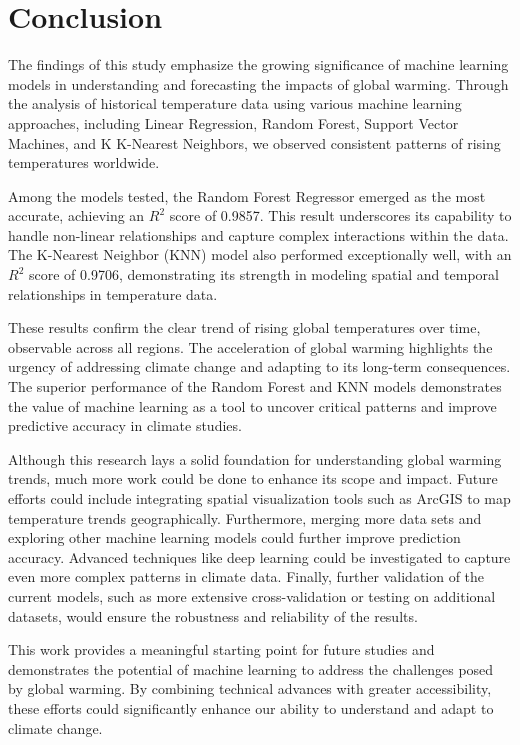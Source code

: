 \documentclass[conference]{IEEEtran}
\begin{document}
\section{Conclusion}
The findings of this study emphasize the growing significance of machine learning models in understanding and forecasting the impacts of global warming. Through the analysis of historical temperature data using various machine learning approaches, including Linear Regression, Random Forest, Support Vector Machines, and K K-Nearest Neighbors, we observed consistent patterns of rising temperatures worldwide.

Among the models tested, the Random Forest Regressor emerged as the most accurate, achieving an \(R^2\) score of 0.9857. This result underscores its capability to handle non-linear relationships and capture complex interactions within the data. The K-Nearest Neighbor (KNN) model also performed exceptionally well, with an \(R^2\) score of 0.9706, demonstrating its strength in modeling spatial and temporal relationships in temperature data.

These results confirm the clear trend of rising global temperatures over time, observable across all regions. The acceleration of global warming highlights the urgency of addressing climate change and adapting to its long-term consequences. The superior performance of the Random Forest and KNN models demonstrates the value of machine learning as a tool to uncover critical patterns and improve predictive accuracy in climate studies.

Although this research lays a solid foundation for understanding global warming trends, much more work could be done to enhance its scope and impact. Future efforts could include integrating spatial visualization tools such as ArcGIS to map temperature trends geographically. Furthermore, merging more data sets and exploring other machine learning models could further improve prediction accuracy. Advanced techniques like deep learning could be investigated to capture even more complex patterns in climate data. Finally, further validation of the current models, such as more extensive cross-validation or testing on additional datasets, would ensure the robustness and reliability of the results.

This work provides a meaningful starting point for future studies and demonstrates the potential of machine learning to address the challenges posed by global warming. By combining technical advances with greater accessibility, these efforts could significantly enhance our ability to understand and adapt to climate change.
\end{document}
